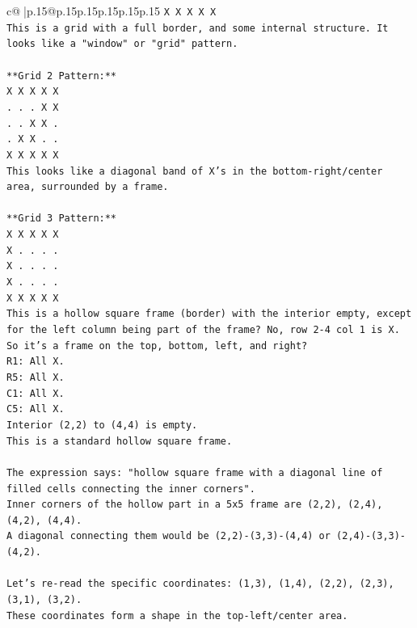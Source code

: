 \documentclass{article}
\begin{document}
{\begin{supertabular}{c@{$\;$}|p{.15\linewidth}@{}p{.15\linewidth}p{.15\linewidth}p{.15\linewidth}p{.15\linewidth}p{.15\linewidth}}
{{{\texttt{X X X X X} \\
\texttt{This is a grid with a full border, and some internal structure. It looks like a "window" or "grid" pattern.} \\
\\ 
\texttt{**Grid 2 Pattern:**} \\
\texttt{X X X X X} \\
\texttt{. . . X X} \\
\texttt{. . X X .} \\
\texttt{. X X . .} \\
\texttt{X X X X X} \\
\texttt{This looks like a diagonal band of X's in the bottom{-}right/center area, surrounded by a frame.} \\
\\ 
\texttt{**Grid 3 Pattern:**} \\
\texttt{X X X X X} \\
\texttt{X . . . .} \\
\texttt{X . . . .} \\
\texttt{X . . . .} \\
\texttt{X X X X X} \\
\texttt{This is a hollow square frame (border) with the interior empty, except for the left column being part of the frame? No, row 2{-}4 col 1 is X. So it's a frame on the top, bottom, left, and right?} \\
\texttt{R1: All X.} \\
\texttt{R5: All X.} \\
\texttt{C1: All X.} \\
\texttt{C5: All X.} \\
\texttt{Interior (2,2) to (4,4) is empty.} \\
\texttt{This is a standard hollow square frame.} \\
\\ 
\texttt{The expression says: "hollow square frame with a diagonal line of filled cells connecting the inner corners".} \\
\texttt{Inner corners of the hollow part in a 5x5 frame are (2,2), (2,4), (4,2), (4,4).} \\
\texttt{A diagonal connecting them would be (2,2){-}(3,3){-}(4,4) or (2,4){-}(3,3){-}(4,2).} \\
\\ 
\texttt{Let's re{-}read the specific coordinates: (1,3), (1,4), (2,2), (2,3), (3,1), (3,2).} \\
\texttt{These coordinates form a shape in the top{-}left/center area.} \\
}}}
\end{supertabular}}
\end{document}
